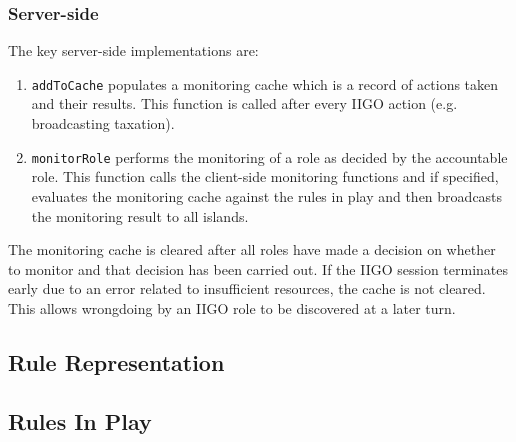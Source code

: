 \subsubsection{Server-side}

The key server-side implementations are:
\begin{enumerate}
    \item \texttt{addToCache} populates a monitoring cache which is a record of actions taken and their results. This function is called after every IIGO action (e.g. broadcasting taxation).
    \item \texttt{monitorRole} performs the monitoring of a role as decided by the accountable role. This function calls the client-side monitoring functions and if specified, evaluates the monitoring cache against the rules in play and then broadcasts the monitoring result to all islands.
\end{enumerate}

The monitoring cache is cleared after all roles have made a decision on whether to monitor and that decision has been carried out. If the IIGO session terminates early due to an error related to insufficient resources, the cache is not cleared. This allows wrongdoing by an IIGO role to be discovered at a later turn.

\subsection{Rule Representation}
\subsection{Rules In Play}
